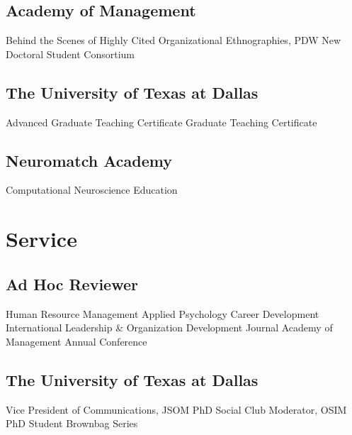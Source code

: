\subsection*{Academy of Management}

\begin{entries}
    Behind the Scenes of Highly Cited Organizational Ethnographies, PDW
    New Doctoral Student Consortium
\end{entries}

\subsection*{The University of Texas at Dallas}

\begin{entries}
    Advanced Graduate Teaching Certificate
    Graduate Teaching Certificate
\end{entries}

\subsection*{Neuromatch Academy}

\begin{entries}
    Computational Neuroscience Education
\end{entries}
\fi


\section*{Service}

\subsection*{Ad Hoc Reviewer}

\begin{entries}
    \entn{}Human Resource Management
    \entn{}Applied Psychology
    \entn{}Career Development International
    \entn{}Leadership \& Organization Development Journal
    \entn{}Academy of Management Annual Conference
\end{entries}

\subsection*{The University of Texas at Dallas}

\begin{entries}
    Vice President of Communications, JSOM PhD Social Club
    Moderator, OSIM PhD Student Brownbag Series
\end{entries}

